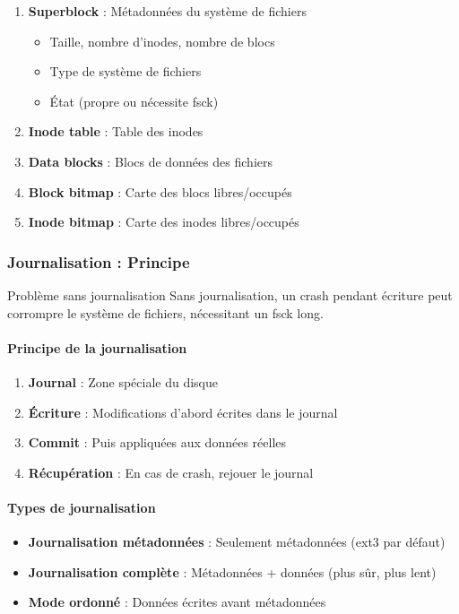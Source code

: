 \documentclass[12pt,a4paper]{article}
\begin{document}
\begin{enumerate}
    \item \textbf{Superblock} : Métadonnées du système de fichiers
    \begin{itemize}
        \item Taille, nombre d'inodes, nombre de blocs
        \item Type de système de fichiers
        \item État (propre ou nécessite fsck)
    \end{itemize}
    \item \textbf{Inode table} : Table des inodes
    \item \textbf{Data blocks} : Blocs de données des fichiers
    \item \textbf{Block bitmap} : Carte des blocs libres/occupés
    \item \textbf{Inode bitmap} : Carte des inodes libres/occupés
\end{enumerate}

\subsubsection{Journalisation : Principe}

\begin{infobox}{Problème sans journalisation}
Sans journalisation, un crash pendant écriture peut corrompre le système de fichiers, nécessitant un fsck long.
\end{infobox}

\paragraph{Principe de la journalisation}
\begin{enumerate}
    \item \textbf{Journal} : Zone spéciale du disque
    \item \textbf{Écriture} : Modifications d'abord écrites dans le journal
    \item \textbf{Commit} : Puis appliquées aux données réelles
    \item \textbf{Récupération} : En cas de crash, rejouer le journal
\end{enumerate}

\paragraph{Types de journalisation}
\begin{itemize}
    \item \textbf{Journalisation métadonnées} : Seulement métadonnées (ext3 par défaut)
    \item \textbf{Journalisation complète} : Métadonnées + données (plus sûr, plus lent)
    \item \textbf{Mode ordonné} : Données écrites avant métadonnées
\end{itemize}
\end{document}
